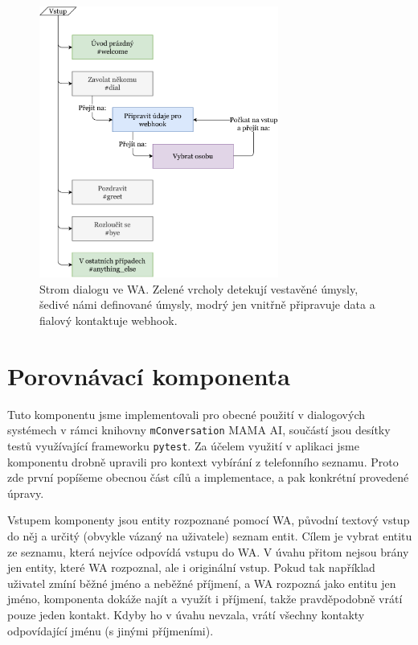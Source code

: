 \begin{figure}[h]
    \centering
    \includegraphics[width=0.7\textwidth]{../img/wa-tree.pdf}
    \caption{Strom dialogu ve WA. Zelené vrcholy detekují vestavěné úmysly,
        šedivé námi definované úmysly, modrý jen vnitřně připravuje data a fialový
        kontaktuje webhook.}
    \label{img-wa-tree}
\end{figure}

\section{Porovnávací komponenta}\label{matching}

Tuto komponentu jsme implementovali pro obecné použití v dialogových systémech
v rámci knihovny \texttt{mConversation} MAMA AI, součástí jsou desítky testů
využívající frameworku \texttt{pytest}. Za účelem využití v aplikaci jsme komponentu
drobně upravili pro kontext vybírání z telefonního seznamu. Proto zde první popíšeme
obecnou část cílů a implementace, a pak konkrétní provedené úpravy.

Vstupem komponenty jsou entity rozpoznané pomocí WA, původní textový vstup do něj
a určitý (obvykle vázaný na uživatele) seznam entit. Cílem je vybrat entitu ze seznamu,
která nejvíce odpovídá vstupu do WA. V úvahu přitom nejsou brány jen entity, které
WA rozpoznal, ale i originální vstup. Pokud tak například uživatel zmíní běžné jméno a
neběžné příjmení, a WA rozpozná jako entitu jen jméno, komponenta dokáže najít a využít
i příjmení, takže pravděpodobně vrátí pouze jeden kontakt. Kdyby ho v úvahu nevzala,
vrátí všechny kontakty odpovídající jménu (s jinými příjmeními).

